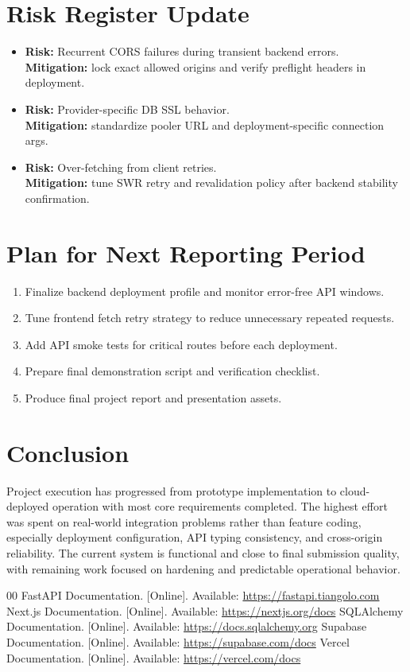 \documentclass[conference]{IEEEtran}
\begin{document}
\section{Risk Register Update}
\begin{itemize}
\item \textbf{Risk:} Recurrent CORS failures during transient backend errors.\\
\textbf{Mitigation:} lock exact allowed origins and verify preflight headers in deployment.
\item \textbf{Risk:} Provider-specific DB SSL behavior.\\
\textbf{Mitigation:} standardize pooler URL and deployment-specific connection args.
\item \textbf{Risk:} Over-fetching from client retries.\\
\textbf{Mitigation:} tune SWR retry and revalidation policy after backend stability confirmation.
\end{itemize}

\section{Plan for Next Reporting Period}
\begin{enumerate}
\item Finalize backend deployment profile and monitor error-free API windows.
\item Tune frontend fetch retry strategy to reduce unnecessary repeated requests.
\item Add API smoke tests for critical routes before each deployment.
\item Prepare final demonstration script and verification checklist.
\item Produce final project report and presentation assets.
\end{enumerate}

\section{Conclusion}
Project execution has progressed from prototype implementation to cloud-deployed operation with most core requirements completed. The highest effort was spent on real-world integration problems rather than feature coding, especially deployment configuration, API typing consistency, and cross-origin reliability. The current system is functional and close to final submission quality, with remaining work focused on hardening and predictable operational behavior.

\begin{thebibliography}{00}
 FastAPI Documentation. [Online]. Available: \url{https://fastapi.tiangolo.com}
 Next.js Documentation. [Online]. Available: \url{https://nextjs.org/docs}
 SQLAlchemy Documentation. [Online]. Available: \url{https://docs.sqlalchemy.org}
 Supabase Documentation. [Online]. Available: \url{https://supabase.com/docs}
 Vercel Documentation. [Online]. Available: \url{https://vercel.com/docs}
\end{thebibliography}
\end{document}
